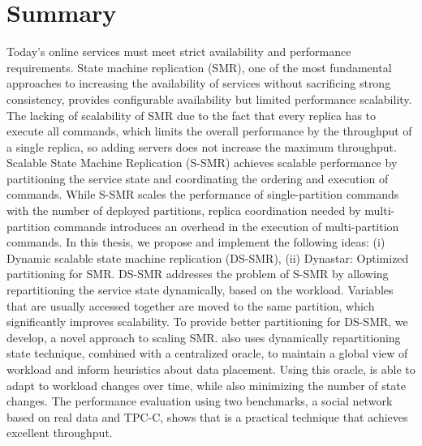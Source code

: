 \newpage
\section{Summary}
Today's online services must meet strict availability and performance
requirements. State machine replication (SMR), one of the most fundamental
approaches to increasing the availability of services without sacrificing
strong consistency, provides configurable availability but limited performance
scalability. The lacking of scalability of SMR due to the fact that every
replica has to execute all commands, which limits the overall performance by the
throughput of a single replica, so adding servers does not increase the
maximum throughput. Scalable State Machine Replication (S-SMR) achieves
scalable performance by partitioning the service state and coordinating the
ordering and execution of commands. While S-SMR scales the performance of
single-partition commands with the number of deployed partitions, replica
coordination needed by multi-partition commands introduces an overhead in the
execution of multi-partition commands. In this thesis, we propose and
implement the following ideas: (i) Dynamic scalable state machine replication
(DS-SMR), (ii) Dynastar: Optimized partitioning for SMR. DS-SMR addresses the
problem of S-SMR by allowing repartitioning the service state dynamically,
based on the workload. Variables that are usually accessed together are moved
to the same partition, which significantly improves scalability. To provide
better partitioning for DS-SMR, we develop, a novel approach to
scaling SMR. also uses dynamically repartitioning state technique,
combined with a centralized oracle, to maintain a global view of workload and
inform heuristics about data placement. Using this oracle, is able
to adapt to workload changes over time, while also minimizing the number of
state changes. The performance evaluation using two benchmarks, a social
network based on real data and TPC-C, shows that is a practical
technique that achieves excellent throughput.